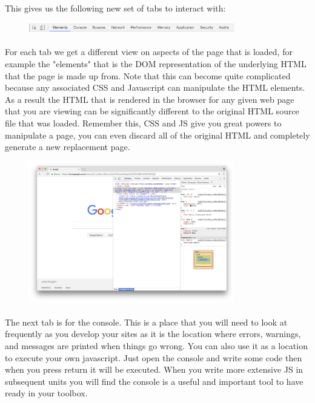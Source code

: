 \paragraph{} This gives us the following new set of tabs to interact with:

\begin{figure}[H]
\centering
\includegraphics[width=0.8\textwidth]{figures/devtools_toolbar.png}
\label{fig:devtools_toolbar}
\end{figure}


\paragraph{} For each tab we get a different view on aspects of the page that is loaded, for example the "elements" that is the DOM representation of the underlying HTML that the page is made up from. Note that this can become quite complicated because any associated CSS and Javascript can manipulate the HTML elements. As a result the HTML that is rendered in the browser for any given web page that you are viewing can be significantly different to the original HTML source file that was loaded. Remember this, CSS and JS give you great powers to manipulate a page, you can even discard all of the original HTML and completely generate a new replacement page.


\begin{figure}[H]
\centering
\includegraphics[width=0.8\textwidth]{figures/devtools_elements.png}
\label{fig:devtools_elements}
\end{figure}

\paragraph{} The next tab is for the console. This is a place that you will need to look at frequently as you develop your sites as it is the location where errors, warnings, and messages are printed when things go wrong.  You can also use it as a location to execute your own javascript. Just open the console and write some code then when you press return it will be executed. When you write more extensive JS in subsequent units you will find the console is a useful and important tool to have ready in your toolbox.


